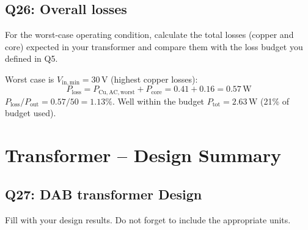 \documentclass{PELsmallreport}
\begin{document}
\subsection{Q26: Overall losses} 
For the worst-case operating condition, calculate the total losses (copper and core) expected in your transformer and compare them with the loss budget you defined in Q5. 


\begin{framed}
	\vspace{2em}
	Worst case is $V_\mathrm{in,min}=30\,\mathrm{V}$ (highest copper losses):
\begin{equation}
    P_\mathrm{loss} = P_\mathrm{Cu,AC,worst} + P_\mathrm{core} = 0.41 + 0.16 = 0.57\,\mathrm{W}
\end{equation}
$P_\mathrm{loss}/P_\mathrm{out} = 0.57/50 = 1.13\%$. Well within the budget $P_\mathrm{tot}=2.63\,\mathrm{W}$ (21\% of budget used).
	\vspace{2em}
\end{framed}

  \hfill{}








\newpage
\section{Transformer -- Design Summary}
\subsection{Q27: DAB transformer Design} 
Fill  with your design results. 
Do not forget to include the appropriate units.
\end{document}
